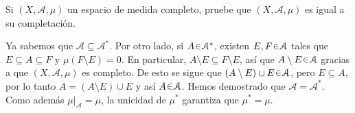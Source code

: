\setcounter{neje}{66}
\begin{nejer}
Si $(X, \mathcal{A}, \mu)$ un espacio de medida completo, pruebe que $(X, \mathcal{A}, \mu)$ es igual a su completación.
\end{nejer}
\begin{sol}
Ya sabemos que $\mathcal{A} \subseteq \mathcal{A}^*$. Por otro lado, si $A\en\mathcal{A}^*$, existen $E,F\en\mathcal{A}$ tales que $E \subseteq A \subseteq F$ y $\mu(F\setminus E) = 0$. En particular, $A \setminus E \subseteq F\setminus E$, así que $A\setminus E \en \mathcal{A}$ gracias a que $(X,\mathcal{A},\mu)$ es completo. De esto se sigue que $(A\setminus E) \cup E \en \mathcal{A}$, pero $E \subseteq A$, por lo tanto $A = (A \setminus E) \cup E$ y así $A \en \mathcal{A}$. Hemos demostrado que $\mathcal{A} = \mathcal{A}^*$. Como además $\mu|_\mathcal{A} = \mu$, la unicidad de $\mu^*$ garantiza que $\mu^* = \mu$.
\end{sol}